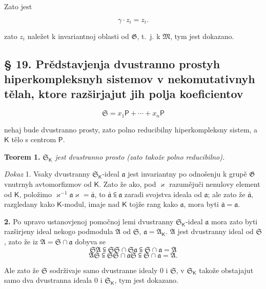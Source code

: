 \documentclass[11pt]{article}
\begin{document}
Zato jest

\[
\gamma\cdot z_i=z_i.
\]

zato \(z_i\) naležet k invariantnoj oblasti od \(\mathfrak G\), t.~j. k \(\mathfrak M\), tym jest dokazano.

\subsection*{§ 19. Prědstavjenja dvustranno prostyh hiperkompleksnyh sistemov v nekomutativnyh tělah, ktore razširjajut jih polja koeficientov}\label{darstellungen-zweiseitig-einfacher-hyperkomplexer-systeme-in-nichtkommutativen-erweiterungskoerpern-ihrer-koeffizientenkoerper}

\[
\mathfrak S=x_1\mathsf P+\cdots+x_n\mathsf P
\]

nehaj bude dvustranno prosty, zato polno reducibilny hiperkompleksny sistem, a \(\mathsf K\) tělo s centrom \(\mathsf P\).

\textbf{Teorem 1.} \emph{\(\mathfrak S_{\mathsf K}\) jest dvustranno prosto (zato takože polno reducibilno).}

\emph{Dokaz} 1. Vsaky dvustranny \(\mathfrak S_{\mathsf K}\)-ideal \(\mathfrak a\) jest invariantny po odnošenju k grupě \(\mathfrak G\) vnutrnyh avtomorfizmov od \(\mathsf K\). Zato že ako, pod \(\varkappa\) razumějuči nenulovy element od \(\mathsf K\), položimo \(\varkappa^{-1}\mathfrak a\varkappa=\bar{\mathfrak a}\), to \(\bar{\mathfrak a}\subseteqq\mathfrak a\) zaradi svojstva ideala od \(\mathfrak a\); ale zato že \(\bar{\mathfrak a}\), razgledany kako \(\mathsf K\)-modul, imaje nad \(\mathsf K\) tojže rang kako \(\mathfrak a\), mora byti \(\bar{\mathfrak a}=\mathfrak a\).

\textbf{2.} Po upravo ustanovjenoj pomočnoj lemi dvustranny \(\mathfrak S_{\mathsf K}\)-ideal \(\mathfrak a\) mora zato byti razširjeny ideal nekogo podmodula \(\mathfrak A\) od \(\mathfrak S\), \(\mathfrak a=\mathfrak A_{\mathsf K}\). \(\mathfrak A\) jest dvustranny ideal od \(\mathfrak S\), zato že iz \(\mathfrak A=\mathfrak S\cap\mathfrak a\) dobyva se
\[
\mathfrak S\mathfrak A\subseteqq\mathfrak S\mathfrak S\cap\mathfrak S\mathfrak a\subseteqq\mathfrak S\cap\mathfrak a=\mathfrak A
\]
\[
\mathfrak A\mathfrak S\subseteqq\mathfrak S\mathfrak S\cap\mathfrak a\mathfrak S\subseteqq\mathfrak S\cap\mathfrak a=\mathfrak A.
\]

Ale zato že \(\mathfrak S\) sodrživaje samo dvustranne idealy 0 i \(\mathfrak S\), v \(\mathfrak S_{\mathsf K}\) takože obstajajut samo dva dvustranna ideala 0 i \(\mathfrak S_{\mathsf K}\), tym jest dokazano.
\end{document}
